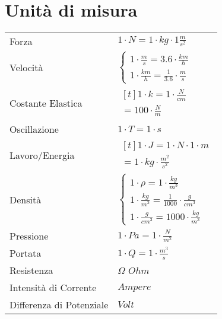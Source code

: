 \section{Unità di misura}
\begin{center}
  \begin{tabularx}{\textwidth}{ l l }
      Forza & $1 \cdot N = 1 \cdot kg \cdot 1 \frac{m}{s^2}$ \\
      Velocità & $\begin{cases}
        1 \cdot \frac{m}{s} = 3.6 \cdot \frac{km}{h} \\
        1 \cdot \frac{km}{h} = \frac{1}{3.6} \cdot \frac{m}{s}
      \end{cases}$ \\
      Costante Elastica & $\!\begin{aligned}[t]1 \cdot k = 1 \cdot \frac{N}{cm} \\ = 100 \cdot \frac{N}{m}\end{aligned}$ \\
      Oscillazione & $1 \cdot T = 1 \cdot s$ \\
      Lavoro/Energia & $\!\begin{aligned}[t]1 \cdot J = 1 \cdot N \cdot 1 \cdot m \\ = 1 \cdot kg \cdot \frac{m^2}{s^2} \end{aligned}$ \\
      Densità & $\begin{cases}
        1 \cdot \rho = 1 \cdot \frac{kg}{m^3} \\
        1 \cdot \frac{kg}{m^3} = \frac{1}{1000} \cdot \frac{g}{cm^3} \\
        1 \cdot \frac{g}{cm^3} = 1000 \cdot \frac{kg}{m^3}
      \end{cases}$ \\
      Pressione & $1 \cdot Pa = 1 \cdot \frac{N}{m^2}$ \\
      Portata & $1 \cdot Q = 1 \cdot \frac{m^3}{s}$ \\
      Resistenza & $\Omega$ $Ohm$  \\
      Intensità di Corrente & $Ampere$ \\
      Differenza di Potenziale & $Volt$
  \end{tabularx}
\end{center}
